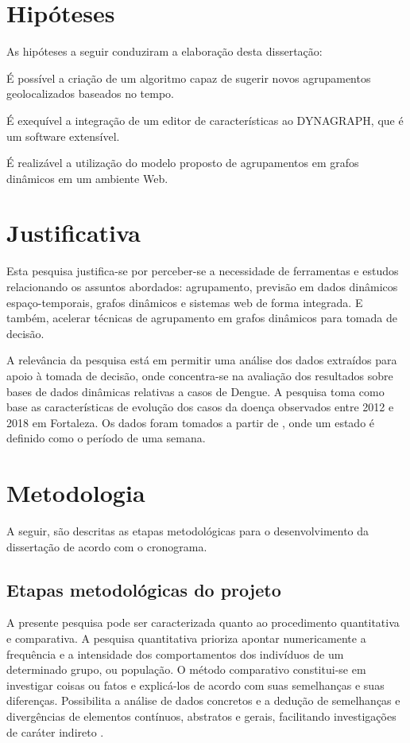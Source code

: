 \section{Hipóteses}
As hipóteses a seguir conduziram a elaboração desta dissertação:
\begin{alineas}
	\item É possível a criação de um algoritmo capaz de sugerir novos agrupamentos geolocalizados baseados no tempo.
	\item É exequível a integração de um editor de características ao DYNAGRAPH, que é um software extensível.
	\item É realizável a utilização do modelo proposto de agrupamentos em grafos dinâmicos em um ambiente Web.
\end{alineas}

\section{Justificativa}
Esta pesquisa justifica-se por perceber-se a necessidade de ferramentas e estudos 
relacionando os assuntos abordados: agrupamento, previsão em dados
dinâmicos espaço-temporais, grafos dinâmicos e sistemas web de forma integrada.
E também, acelerar técnicas de agrupamento em grafos dinâmicos para tomada de decisão.

A relevância da pesquisa está em permitir uma análise dos dados extraídos 
para apoio à tomada de decisão, onde concentra-se na avaliação dos resultados sobre bases de dados
dinâmicas relativas a casos de Dengue.
A pesquisa toma como base as características de evolução dos casos da doença
observados entre 2012 e 2018 em Fortaleza.
Os dados foram tomados a partir de \cite{simda}, onde um estado é definido como o período de uma semana. 

\section{Metodologia}
A seguir, são descritas as etapas metodológicas para o desenvolvimento da dissertação de acordo com o cronograma.

\subsection{Etapas metodológicas do projeto}
A presente pesquisa pode ser caracterizada quanto ao procedimento quantitativa
e comparativa. A pesquisa quantitativa prioriza apontar numericamente a frequência e a
intensidade dos comportamentos dos indivíduos de um determinado grupo, ou população. O
método comparativo constitui-se em investigar coisas ou fatos e explicá-los de acordo com
suas semelhanças e suas diferenças. Possibilita a análise de dados concretos e a dedução de
semelhanças e divergências de elementos contínuos, abstratos e gerais, facilitando investigações
de caráter indireto \cite{fachin}.

